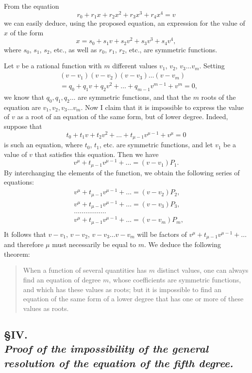 \documentclass[oneside, 12 pt, leqno]{memoir}
\begin{document}
From the equation
\[r_0+r_1 x+r_2 x^2+r_3 x^3+r_4 x^4=v\]
we can easily deduce, using the proposed equation, an expression for the value of \(x\) of the form
\[x=s_0+s_1 v+s_2 v^2+s_3 v^3+s_4 v^4,\]
where \(s_0\), \(s_1\), \(s_2\), etc., as well as \(r_0\), \(r_1\), \(r_2\), etc., are symmetric functions.

Let \(v\) be a rational function with \(m\) different values \(v_1\), \(v_2\), \(v_3 \dots v_m\). Setting
\[\begin{aligned}
& \left(v-v_1\right)\left(v-v_2\right)\left(v-v_3\right) \dots\left(v-v_m\right) \\
& =q_0+q_1 v+q_2 v^2+\dots+q_{m-1} v^{m-1}+v^m=0,
\end{aligned}\]
we know that \(q_0, q_1, q_2 \dots\) are symmetric functions, and that the \(m\) roots of the equation are \(v_1, v_2, v_3 \dots v_m\). Now I claim that it is impossible to express the value of \(v\) as a root of an equation of the same form, but of lower degree. Indeed, suppose that
\[t_0+t_1 v+t_2 v^2+\dots+t_{\mu-1} v^{\mu-1}+v^\mu=0\]
is such an equation, where \(t_0\), \(t_1\), etc. are symmetric functions, and let \(v_1\) be a value of \(v\) that satisfies this equation. Then we have
\[v^\mu+t_{\mu-1} v^{\mu-1}+\dots=\left(v-v_1\right) P_1.\]
By interchanging the elements of the function, we obtain the following series of equations:
\[\begin{aligned}
& v^\mu+t_{\mu-1} v^{\mu-1}+\dots=\left(v-v_2\right) P_2, \\
& v^\mu+t_{\mu-1} v^{\mu-1}+\dots=\left(v-v_3\right) P_3, \\
& \dots \dots \dots. \dots. \dots \\
& v^\mu+t_{\mu-1} v^{\mu-1}+\dots=\left(v-v_m\right) P_m, \\
\end{aligned}\] 
It follows that \(v-v_1\), \(v-v_2\), \(v-v_3 \dots v-v_m\) will be factors of \(v^\mu+t_{\mu-1} v^{\mu-1}+\dots\) and therefore \(\mu\) must necessarily be equal to \(m\). We deduce the following theorem:
\begin{quote}When a function of several quantities has \(m\) distinct values, one can always find an equation of degree \(m\), whose coefficients are symmetric functions, and which has these values as roots; but it is impossible to find an equation of the same form of a lower degree that has one or more of these values as roots.\end{quote}

\subsection*{\S IV.\\
{\scriptsize\textit{Proof of the impossibility of the general resolution of the equation of the fifth degree.}}}
\end{document}
